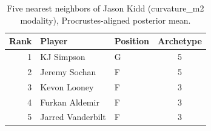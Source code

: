 \begin{table}[htbp]
  \centering\small
  \begin{tabular}{rllc}
    \toprule
    Rank & Player & Position & Archetype \\
    \midrule
    1 & KJ Simpson & G & 5 \\
    2 & Jeremy Sochan & F & 5 \\
    3 & Kevon Looney & F & 3 \\
    4 & Furkan Aldemir & F & 3 \\
    5 & Jarred Vanderbilt & F & 3 \\
    \bottomrule
  \end{tabular}
  \caption{Five nearest neighbors of Jason Kidd (curvature_m2 modality), Procrustes-aligned posterior mean.}
  \label{tab:Jason_Kidd_neighbors_curvature_m2}
\end{table}

